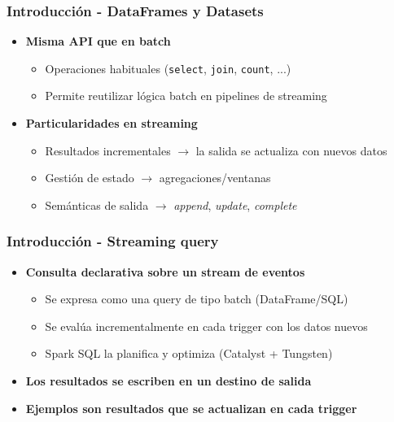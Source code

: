 \documentclass[aspectratio=169]{beamer}
\begin{document}
\begin{frame}\frametitle{Introducción - DataFrames y Datasets}
	\begin{itemize}
		\item \textbf{Misma API que en batch}
		\begin{itemize}
			\item Operaciones habituales (\texttt{select}, \texttt{join}, \texttt{count}, ...)
			\item Permite reutilizar lógica batch en pipelines de streaming
		\end{itemize}

		\vspace{1em}

		\item \textbf{Particularidades en streaming}
		\begin{itemize}
			\item Resultados incrementales $\rightarrow$ la salida se actualiza con nuevos datos
			\item Gestión de estado $\rightarrow$ agregaciones/ventanas 
			\item Semánticas de salida $\rightarrow$ \textit{append}, \textit{update}, \textit{complete}
		\end{itemize}
	\end{itemize}
\end{frame}


\begin{frame}\frametitle{Introducción - Streaming query}
	\begin{itemize}
		\item \textbf{Consulta declarativa sobre un stream de eventos}
		\begin{itemize}
			\item Se expresa como una query de tipo batch (DataFrame/SQL)
			\item Se evalúa incrementalmente en cada trigger con los datos nuevos
			\item Spark SQL la planifica y optimiza (Catalyst + Tungsten)

		\end{itemize}

		\vspace{1em}

		\item \textbf{Los resultados se escriben en un destino de salida}

		\vspace{1em}

		\item \textbf{Ejemplos son resultados que se actualizan en cada trigger}
	\end{itemize}
\end{frame}
\end{document}
